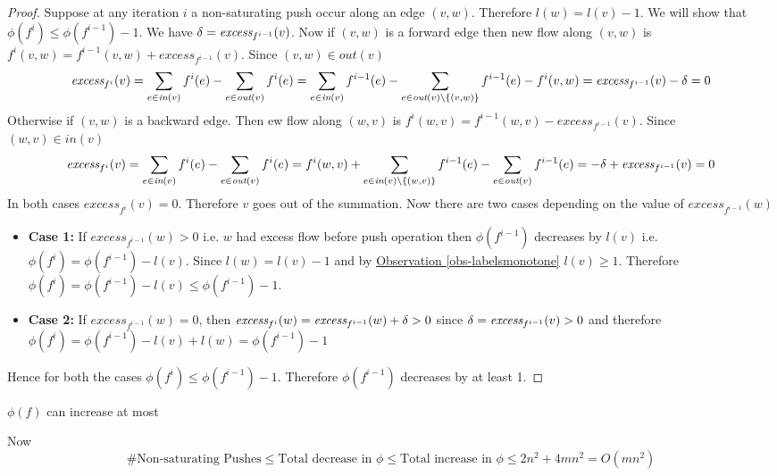 \begin{proof}
	Suppose 	at any iteration $i$  a non-saturating push occur along an edge $(v,w)$. Therefore $l(w)=l(v)-1$. We will show that $\phi(f^i)\leq \phi(f^{i-1})-1$.		We have $\delta=\textit{excess}_{f^{i-1}}(v)$. Now if $(v,w)$ is a forward edge then new flow along $(v,w)$ is $f^i(v,w)=f^{i-1}(v,w)+\textit{excess}_{f^{i-1}}(v)$. Since $(v,w)\in \textit{out}(v)$ 
		$$\textit{excess}_{f^i}(v)=\sum_{e\in \textit{in}(v)}f^i(e)-\sum_{e\in \textit{out}(v)}f^i(e)=          \sum_{e\in \textit{in}(v)}f^{i-1}(e)-\sum_{e\in \textit{out}(v)\setminus\{(v,w)\}}f^{i-1}(e)-f^i(v,w)  =   \textit{excess}_{f^{i-1}}(v)-\delta=0$$ Otherwise if $(v,w)$ is a backward edge. Then  ew flow along $(w,v)$ is  $f^i(w,v)=f^{i-1}(w,v)-\textit{excess}_{f^{i-1}}(v)$. Since $(w,v)\in \textit{in}(v)$ $$\textit{excess}_{f^i}(v)=\sum_{e\in \textit{in}(v)}f^i(e)-\sum_{e\in \textit{out}(v)}f^i(e)=    f^{i}(w,v) +     \sum_{e\in \textit{in}(v)\setminus\{(w,v)\}}f^{i-1}(e)-\sum_{e\in \textit{out}(v)}f^{i-1}(e)  =  -\delta+ \textit{excess}_{f^{i-1}}(v)=0$$In both cases $\textit{excess}_{f^i}(v)=0$. Therefore 	 $v$ goes out of the summation. 		Now there are two cases depending on the value of $\textit{excess}_{f^{i-1}}(w)$\begin{itemize}[label=$\bullet$]
			\item \textbf{Case 1:}
		If $\textit{excess}_{f^{i-1}}(w)>0$ i.e. $w$ had excess flow before push operation then $\phi(f^{i-1})$ decreases by $l(v)$ i.e. $\phi(f^i)=\phi(f^{i-1})-l(v)$. Since $l(w)=l(v)-1$ and by  \hyperref[obs-labelsmonotone]{Observation \ref{obs-labelsmonotone}} $l(v)\geq 1$. Therefore $\phi(f^i)=\phi(f^{i-1})-l(v)\leq \phi(f^{i-1})-1$.
	\item \textbf{Case 2:}	If $\textit{excess}_{f^{i-1}}(w)=0$, then $\textit{excess}_{f^i}(w)=\textit{excess}_{f^{i-1}}(w)+\delta>0$ since $\delta=\textit{excess}_{f^{i-1}}(v)>0$ and therefore $\phi(f^i)=\phi(f^{i-1})-l(v)+l(w)=\phi(f^{i-1})-1$
		\end{itemize}
Hence for both the cases $\phi(f^i)\leq \phi(f^{i-1})-1$. Therefore $\phi(f^{i-1})$ decreases by at least 1.
\end{proof}
\begin{lemma}{}{}
	$\phi(f)$ can increase at most 
\end{lemma}
Now $$\#\text{Non-saturating Pushes}  \leq \text{Total decrease in }\phi\leq \text{Total increase in }\phi\leq 2n^2+4mn^2=O(mn^2)$$